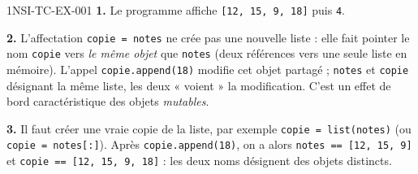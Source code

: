 \begin{corrige}{1NSI-TC-EX-001}
\textbf{1.} Le programme affiche \texttt{[12, 15, 9, 18]} puis \texttt{4}.

\textbf{2.} L'affectation \texttt{copie = notes} ne crée pas une nouvelle liste : elle fait
pointer le nom \texttt{copie} vers \emph{le même objet} que \texttt{notes} (deux références
vers une seule liste en mémoire). L'appel \texttt{copie.append(18)} modifie cet objet
partagé ; \texttt{notes} et \texttt{copie} désignant la même liste, les deux « voient »
la modification. C'est un effet de bord caractéristique des objets \emph{mutables}.

\textbf{3.} Il faut créer une vraie copie de la liste, par exemple
\texttt{copie = list(notes)} (ou \texttt{copie = notes[:]}). Après \texttt{copie.append(18)},
on a alors \texttt{notes == [12, 15, 9]} et \texttt{copie == [12, 15, 9, 18]} : les deux
noms désignent des objets distincts.
\end{corrige}
